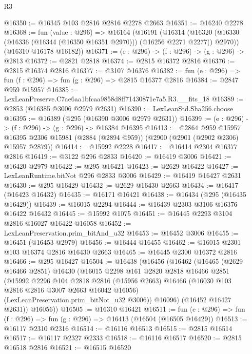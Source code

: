 \begin{lexlean}{R3}
\begin{coremodule}
@16350 := @16345 @103 @2816 @2816 @2278 @2663
@16351 := @16240 @2278
@16368 := fun (value : @296) =>
  @16164
    (@16191
      (@16314 (@16320 (@16330 (@16336 (@16344 (@16350 @16351 @2970))) (@16256 @2271 @2277)) @2970))
      (@16310 @16178 @16182))
@16371 := (e : @296) -> (f : @296) -> (g : @296) -> @2813
@16372 := @2821 @2818
@16374 := @2815 @16372 @2816
@16376 := @2815 @16374 @2816
@16377 := @3107 @16376
@16382 := fun (e : @296) => fun (f : @296) => fun (g : @296) => @2815 @16377 @2816
@16384 := @2847 @959 @15957
@16385 := LexLeanPreserve.C7ae6aa1bfcaa9858d8ff71430871e7a5.R3.__fits_18
@16389 := @2853 (@16385 @3006 @2979 @2631)
@16390 := LexLeanStd.Sha256.choose
@16395 := @16389 (@295 (@16390 @3006 @2979 @2631))
@16399 := (e : @296) -> (f : @296) -> (g : @296) -> @16384 @16395
@16413 := @2864
    @959
    @15957
    @16395
    @2306
    @15981
    (@2884 (@2894 @959))
    (@2900 (@2901 (@2902 @2306) @15957 @2879))
@16414 := @15992 @2228
@16417 := @16414 @2304 @16377 @2816
@16419 := @3122 @296 @2833
@16420 := @16419 @3006
@16421 := @16420 @2979
@16422 := @295 @16421
@16423 := @2629 @16422
@16427 := LexLeanRuntime.bitNot @296 @2833 @3006
@16429 := @16419 @16427 @2631
@16430 := @295 @16429
@16432 := @2629 @16430 @2663
@16434 := @16417 (@16423 @16432)
@16435 := @16171 @16421
@16438 := @16434 (@295 (@16435 @16429))
@16439 := @16015 @2294
@16444 := @16439 @2303 @3106 @16376 @16422 @16432
@16445 := @15992 @1075
@16451 := @16445 @2293 @3104 @2816 @16027 @16422 @16058
@16452 := LexLeanPreservation.prim_bitAnd_u32
@16453 := @16452 @3006
@16455 := @16451 (@16453 @2979)
@16456 := @16444 @16455
@16462 := @16015 @2301 @103 @16374 @2816 @16430 @2663
@16465 := @16445 @2300 @16372 @2816
@16466 := @295 @16427
@16504 := @16438
    (@16456
      (@16462
        (@16465
          (@2629 @16466 @2851)
          @16430
          (@16015
            @2298
            @161
            @2820
            @2818
            @16466
            @2851
            (@15992
              @2296
              @104
              @2818
              @2816
              (@15956 @2663)
              @16466
              (@16030 @103 @2816 @2816 @3007 @2663 @16042 @16056)
              (LexLeanPreservation.prim_bitNot_u32 @3006))
            @16096)
          (@16452 @16427 @2631))
        @16056))
@16505 := @16310 @16421
@16511 := fun (e : @296) => fun (f : @296) => fun (g : @296) => @16413 (@16504 (@16505 @16429))
@16513 := @16117 @2310 @2316
@16514 := @16116 @16513
@16515 := @2815 @16514
@16517 := @16117 @2327 @2333
@16518 := @16116 @16517
@16520 := @2815 @16518 @2816
@16521 := @16515 @16520

\end{coremodule}
\end{lexlean}
